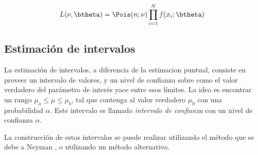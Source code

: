 \begin{equation}
  L(\nu,\btheta) = \Pois(n;\nu) \prod_{i=1}^{N} f(x_i; \btheta)
\end{equation}


\subsection{Estimación de intervalos}


La estimación de intervalos, a diferencia de la estimacion puntual,
consiste en proveer un intervalo de valores, y un nivel de
confianza sobre como el valor verdadero del parámetro de interés yace entre esos
límites. La idea es encontrar un rango $\mu_a \leq \mu \leq \mu_b$, tal
que contenga al valor verdadero $\mu_0$ con una probabilidad $\alpha$. Este
intervalo es llamado \emph{intervalo de confianza} con un nivel de confianza
$\alpha$.

La construcción de estos intervalos se puede realizar utilizando el método que
se debe a Neyman , o utilizando un método alternativo.







